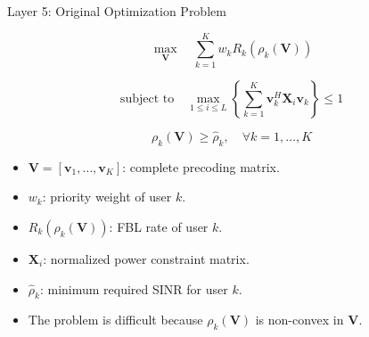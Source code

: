 \documentclass{beamer}
\begin{document}
\begin{frame}{Layer 5: Original Optimization Problem}
\scriptsize

\[
\max_{\mathbf{V}}
\quad
\sum_{k=1}^{K} w_k R_k(\rho_k(\mathbf{V}))
\]

\[
\text{subject to}
\quad
\max_{1\le i\le L}
\left\{
\sum_{k=1}^{K}\mathbf{v}_k^H\mathbf{X}_i\mathbf{v}_k
\right\}
\le 1
\]

\[
\rho_k(\mathbf{V})\ge \widehat{\rho}_k,
\quad \forall k=1,\ldots,K
\]

\begin{itemize}
    \item \(\mathbf{V}=[\mathbf{v}_1,\ldots,\mathbf{v}_K]\): complete precoding matrix.
    \item \(w_k\): priority weight of user \(k\).
    \item \(R_k(\rho_k(\mathbf{V}))\): FBL rate of user \(k\).
    \item \(\mathbf{X}_i\): normalized power constraint matrix.
    \item \(\widehat{\rho}_k\): minimum required SINR for user \(k\).
    \item The problem is difficult because \(\rho_k(\mathbf{V})\) is non-convex in \(\mathbf{V}\).
\end{itemize}

\end{frame}
\end{document}
